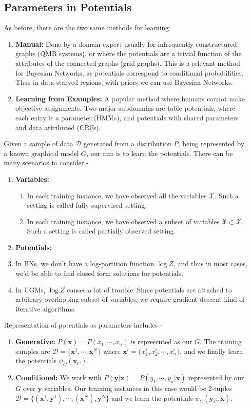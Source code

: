 \subsection{Parameters in Potentials}
As before, there are the two same methods for learning:
\begin{enumerate}
	\item \textbf{Manual:} Done by a domain expert usually for infrequently constructured graphs (QMR systems), or where the potentials are a trivial function of the attributes of the connected graphs (grid graphs). This is a relevant method for Bayesian Networks, as potentials correspond to conditional probabilities. Thus in data-starved regions, with priors we can use Bayesian Networks.
	\item \textbf{Learning from Examples:} A popular method where humans cannot make objective assignments. Two major subdomains are table potentials, where each entry is a parameter (HMMs), and potentials with shared parameters and data attributed (CRFs).
\end{enumerate}
Given a sample of data $\mathcal D$ generated from a distribution $P$, being represented by a known graphical model $G$, our aim is to learn the potentials. There can be many scenarios to consider -
\begin{enumerate}
	\item \textbf{Variables:}
	\begin{enumerate}
		\item In each training instance, we have observed all the variables $\mathcal{X}$. Such a setting is called fully supervised setting.
		\item In each training instance, we have observed a subset of variables $\mathfrak{X} \subset \mathcal{X}$. Such a setting is called partially observed setting.
	\end{enumerate}
	\item \textbf{Potentials:}
	\item In BNs, we don't have a log-partition function $\log Z$, and thus in most cases, we'd be able to find closed form solutions for potentials.
	\item In UGMs, $\log Z$ causes a lot of trouble. Since potentials are attached to arbitrary overlapping subset of variables, we require gradient descent kind of iterative algorithms.
\end{enumerate}
Representation of potentials as parameters includes - 
\begin{enumerate}
	\item \textbf{Generative:} 
	$P(\mathbf x) = P(x_1, \cdots, x_n)$ is represented as our $G$. The training samples are $\mathcal{D} = \{\mathbf{x}^1, \cdots, \mathbf{x}^N\}$ where
	$\mathbf{x}^i = \{x_1^i, x_2^i, \cdots, x_n^i\}$, and we finally learn the potentials $\psi_C(\mathbf x_C)$.
	\item \textbf{Conditional:}
	We work with $P(\mathbf{y|x}) = P(y_1, \cdots, y_n|\mathbf x)$ represented by our $G$ over $\mathbf{y}$ variables. Our training instances in this case would be 2-tuples $\mathcal{D} = \{(\mathbf{x}^1, \mathbf{y}^1), \cdots, (\mathbf{x}^N), \mathbf{y}^N\}$ and we learn the potentials $\psi_C(\mathbf{y}_C, \mathbf x)$.
\end{enumerate}
